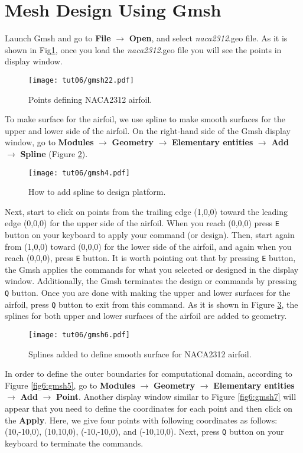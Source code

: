 \section{Mesh Design Using Gmsh}
Launch Gmsh and go to \textbf{File} $\rightarrow$ \textbf{Open}, and select \textit{naca2312}.geo file. As it is shown in Fig\ref{fig6:gmsh22}, once you load the \textit{naca2312}.geo file you will see the points in display window.
\begin{figure}[htbp]
    \centering
    \texttt{[image: tut06/gmsh22.pdf]}
    \caption{Points defining NACA2312 airfoil.}
    \label{fig6:gmsh22}
\end{figure}
To make surface for the airfoil, we use spline to make smooth surfaces for the upper and lower side of the airfoil. On the right-hand side of the Gmsh display window, go to \textbf{Modules} $\rightarrow$ \textbf{Geometry} $\rightarrow$ \textbf{Elementary entities} $\rightarrow$ \textbf{Add} $\rightarrow$ \textbf{Spline} (Figure \ref{fig6:gmsh4}).
\begin{figure}[htbp]
    \centering
    \texttt{[image: tut06/gmsh4.pdf]}
    \caption{How to add spline to design platform.}
    \label{fig6:gmsh4}
\end{figure}
Next, start to click on points from the trailing edge (1,0,0) toward the leading edge (0,0,0) for the upper side of the airfoil. When you reach (0,0,0) press \texttt{E} button on your keyboard to apply your command (or design). Then, start again from (1,0,0) toward (0,0,0) for the lower side of the airfoil, and again when you reach (0,0,0), press \texttt{E} button. It is worth pointing out that by pressing \texttt{E} button, the Gmsh applies the commands for what you selected or designed in the display window. Additionally, the Gmsh terminates the design or commands by pressing \texttt{Q} button. Once you are done with making the upper and lower surfaces for the airfoil, press \texttt{Q} button to exit from this command. As it is shown in Figure \ref{fig6:gmsh6}, the splines for both upper and lower surfaces of the airfoil are added to geometry.
\begin{figure}[htbp]
    \centering
    \texttt{[image: tut06/gmsh6.pdf]}
    \caption{Splines added to define smooth surface for NACA2312 airfoil.}
    \label{fig6:gmsh6}
\end{figure}
In order to define the outer boundaries for computational domain, according to Figure \ref{fig6:gmsh5}, go to \textbf{Modules} $\rightarrow$ \textbf{Geometry} $\rightarrow$ \textbf{Elementary entities} $\rightarrow$ \textbf{Add} $\rightarrow$ \textbf{Point}. Another display window similar to Figure \ref{fig6:gmsh7} will appear that you need to define the coordinates for each point and then click on the \textbf{Apply}. Here, we give four points with following coordinates as follows: (10,-10,0), (10,10,0), (-10,-10,0), and (-10,10,0). Next, press \texttt{Q} button on your keyboard to terminate the commands.
